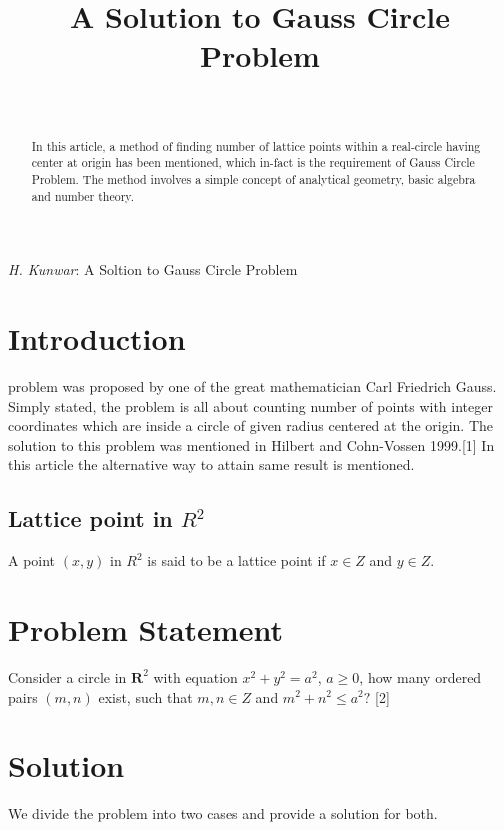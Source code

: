 \documentclass[journal,twoside]{IEEEtran}
\begin{document}
    \setcounter{page}{1}
\title{A Solution to Gauss Circle Problem}


\author{\\
}
%
{\textit{H. Kunwar}: A Soltion to Gauss Circle Problem}
\maketitle


\begin{abstract}
In this article, a method of finding number of lattice points within a real-circle having center at origin has been mentioned, which in-fact is the requirement of Gauss Circle Problem. The method involves a simple concept of analytical geometry, basic algebra and number theory.
\end{abstract}




\section{Introduction}
 problem was proposed by one of the great mathematician Carl Friedrich Gauss. Simply stated, the problem is all about counting number of points with integer coordinates which are inside a circle of given radius centered at the origin. The solution to this problem was mentioned in Hilbert and Cohn-Vossen 1999.[1] In this article the alternative way to attain same result is mentioned.
 \subsection{Lattice point in $R^{2}$}
A point $(x,y)$ in $R^{2}$ is said to be a lattice point if $x \in Z$ and $y \in Z$.




\section{Problem Statement}
Consider a circle in $\textbf{R}^{2}$ with equation $x^{2}+y^{2}=a^{2}$, $a \geq 0$, how many ordered pairs $(m,n)$ exist, such that $m,n \in Z$ and $m^{2}+n^{2} \leq a^{2}?$ [2]
\section{Solution}
We divide the problem into two cases and provide a solution for both.
\end{document}
